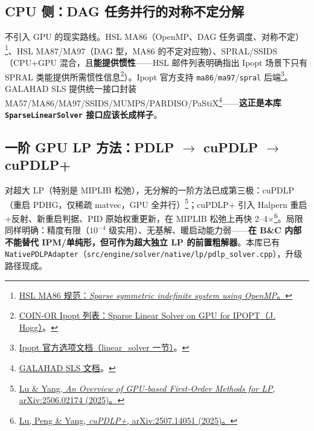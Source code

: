 \documentclass[11pt,a4paper]{ctexart}
\newcommand{\file}[1]{\texttt{#1}}
\newcommand{\func}[1]{\texttt{#1}}
\newcommand{\opt}[1]{\texttt{#1}}
\begin{document}
\subsection{CPU 侧：DAG 任务并行的对称不定分解}
不引入 GPU 的现实路线。HSL MA86（OpenMP、DAG 任务调度、对称不定）\footnote{\href{https://www.hsl.rl.ac.uk/specs/hsl_ma86.pdf}{HSL MA86 规范：\emph{Sparse symmetric indefinite system using OpenMP}。}}、HSL MA87/MA97（DAG 型，MA86 的不定对应物）、SPRAL/SSIDS（CPU+GPU 混合，且\textbf{能提供惯性}——HSL 邮件列表明确指出 Ipopt 场景下只有 SPRAL 类能提供所需惯性信息\footnote{\href{https://list.coin-or.org/pipermail/ipopt/2016-August/004295.html}{COIN-OR Ipopt 列表：Sparse Linear Solver on GPU for IPOPT（J. Hogg）}。}）。Ipopt 官方支持 \opt{ma86}/\opt{ma97}/\opt{spral} 后端\footnote{\href{https://coin-or.github.io/Ipopt/OPTIONS.html}{Ipopt 官方选项文档（linear\_solver 一节）}。}。GALAHAD SLS 提供统一接口封装 MA57/MA86/MA97/SSIDS/MUMPS/PARDISO/PaStiX\footnote{\href{https://ralna.github.io/galahad_docs/html/C/sls.html}{GALAHAD SLS 文档}。}——\textbf{这正是本库 \func{SparseLinearSolver} 接口应该长成样子}。

\subsection{一阶 GPU LP 方法：PDLP $\to$ cuPDLP $\to$ cuPDLP+}
对超大 LP（特别是 MIPLIB 松弛），无分解的一阶方法已成第三极：cuPDLP（重启 PDHG，仅稀疏 matvec，GPU 全并行）\footnote{\href{https://arxiv.org/pdf/2506.02174}{Lu \& Yang, \emph{An Overview of GPU-based First-Order Methods for LP}, arXiv:2506.02174 (2025)。}}；cuPDLP+ 引入 Halpern 重启+反射、新重启判据、PID 原始权重更新，在 MIPLIB 松弛上再快 2--4$\times$\footnote{\href{https://arxiv.org/abs/2507.14051}{Lu, Peng \& Yang, \emph{cuPDLP+}, arXiv:2507.14051 (2025)。}}。局限同样明确：精度有限（$10^{-4}$ 级实用）、无基解、暖启动能力弱——\textbf{在 B\&C 内部不能替代 IPM/单纯形，但可作为超大独立 LP 的前置粗解器}。本库已有 \func{NativePDLPAdapter}（\file{src/engine/solver/native/lp/pdlp\_solver.cpp}），升级路径现成。
\end{document}
